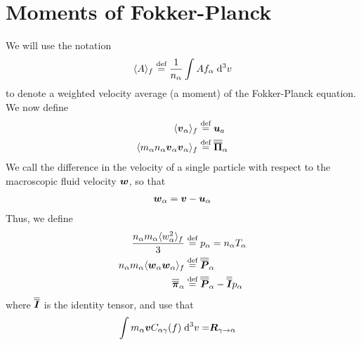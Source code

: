 \section{Moments of Fokker-Planck}
We will use the notation
%
\begin{align*}
    \expt{A}_f \defined \frac{1}{n_\a}\inde{Af_\a}{^3v}
\end{align*}
%
to denote a weighted velocity average (a moment) of the Fokker-Planck equation.
We now define
%
\begin{align*}
    \expt{\ve{v}_\a}_f        \defined& \; \ve{u}_a      \\
    \expt{m_\a n_\a \ve{v}_\a\ve{v}_\a}_f \defined&\; \te{\Pi}_\a
\end{align*}
%
We call the difference in the velocity of a single particle with respect to the
macroscopic fluid velocity $\ve{w}$, so that
%
\begin{align*}
    \ve{w}_\a = \ve{v} - \ve{u}_\a
\end{align*}
%
Thus, we define
%
\begin{align*}
    \frac{n_\a m_\a\expt{w_\a^2}_f}{3} \defined& \; p_\a = n_\a T_\a\\
    n_\a m_\a\expt{\ve{w}_{\a}\ve{w}_{\a}}_f \defined& \; \te{P}_\a\\
    \te{\pi}_\a \defined& \; \te{P}_\a - \te{I}p_\a\\
\end{align*}
%
where $\te{I}$ is the identity tensor, and use that
%
\begin{align*}
    \inde{m_\a\ve{v} C_{\a\g}(f)}{^3v} =& \ve{R}_{\g\to\a}
\end{align*}
%

